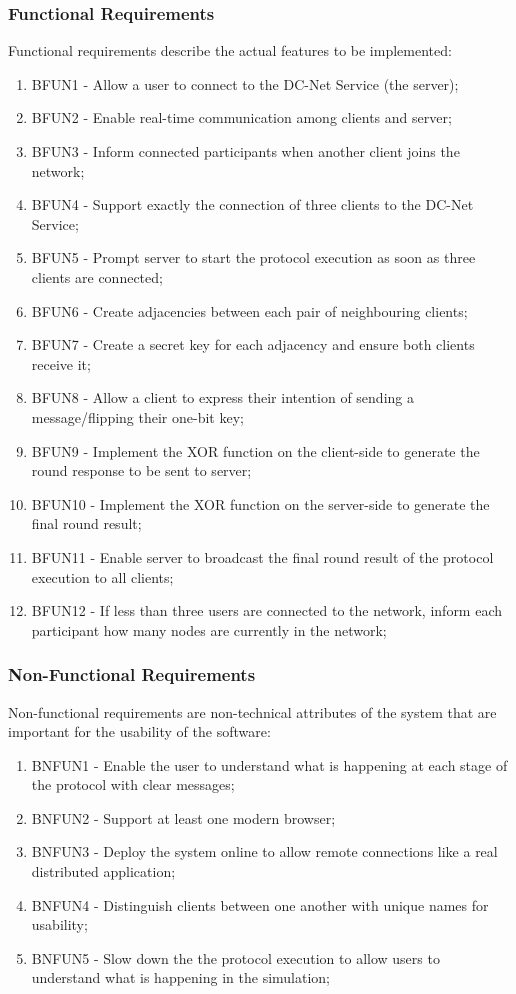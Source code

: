 \subsubsection{Functional Requirements}
Functional requirements describe the actual features to be implemented:
\begin{enumerate}
    \item BFUN1 - Allow a user to connect to the DC-Net Service (the server);
    \item BFUN2 - Enable real-time communication among clients and server;
    \item BFUN3 - Inform connected participants when another client joins the network;
    \item BFUN4 - Support exactly the connection of three clients to the DC-Net Service;
    \item BFUN5 - Prompt server to start the protocol execution as soon as three clients are connected;
    \item BFUN6 - Create adjacencies between each pair of neighbouring clients;
    \item BFUN7 - Create a secret key for each adjacency and ensure both clients receive it;
    \item BFUN8 - Allow a client to express their intention of sending a message/flipping their one-bit key;
    \item BFUN9 - Implement the XOR function on the client-side to generate the round response to be sent to server;
    \item BFUN10 - Implement the XOR function on the server-side to generate the final round result;
    \item BFUN11 - Enable server to broadcast the final round result of the protocol execution to all clients;
    \item BFUN12 - If less than three users are connected to the network, inform each participant how many nodes are currently in the network;
\end{enumerate}

\subsubsection{Non-Functional Requirements}
Non-functional requirements are non-technical attributes of the system that are important for the usability of the software: 
\begin{enumerate}
    \item BNFUN1 - Enable the user to understand what is happening at each stage of the protocol with clear messages;
    \item BNFUN2 - Support at least one modern browser;
    \item BNFUN3 - Deploy the system online to allow remote connections like a real distributed application;
    \item BNFUN4 - Distinguish clients between one another with unique names for usability;
    \item BNFUN5 - Slow down the the protocol execution to allow users to understand what is happening in the simulation;
\end{enumerate}

